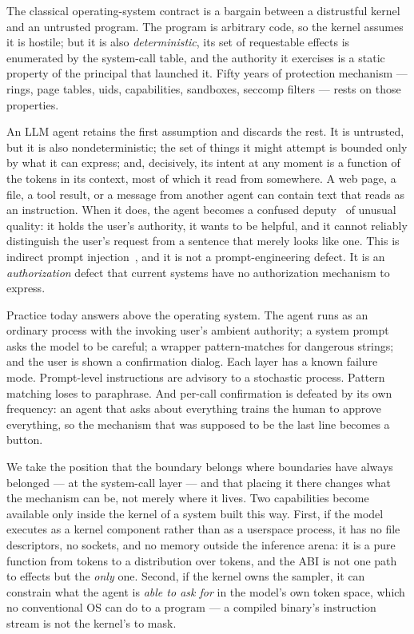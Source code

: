 \documentclass[11pt]{article}
\begin{document}
The classical operating-system contract is a bargain between a distrustful
kernel and an untrusted program. The program is arbitrary code, so the kernel
assumes it is hostile; but it is also \emph{deterministic}, its set of
requestable effects is enumerated by the system-call table, and the authority
it exercises is a static property of the principal that launched it. Fifty
years of protection mechanism --- rings, page tables, uids, capabilities,
sandboxes, seccomp filters --- rests on those properties.

An LLM agent retains the first assumption and discards the rest. It is
untrusted, but it is also nondeterministic; the set of things it might attempt
is bounded only by what it can express; and, decisively, its intent at any
moment is a function of the tokens in its context, most of which it read from
somewhere. A web page, a file, a tool result, or a message from another agent
can contain text that reads as an instruction. When it does, the agent becomes
a confused deputy~\cite{hardy1988confused} of unusual quality: it holds the
user's authority, it wants to be helpful, and it cannot reliably distinguish
the user's request from a sentence that merely looks like one. This is
indirect prompt injection~\cite{greshake2023injection}, and it is not a
prompt-engineering defect. It is an \emph{authorization} defect that current
systems have no authorization mechanism to express.

Practice today answers above the operating system. The agent runs as an
ordinary process with the invoking user's ambient authority; a system prompt
asks the model to be careful; a wrapper pattern-matches for dangerous strings;
and the user is shown a confirmation dialog. Each layer has a known failure
mode. Prompt-level instructions are advisory to a stochastic process. Pattern
matching loses to paraphrase. And per-call confirmation is defeated by its own
frequency: an agent that asks about everything trains the human to approve
everything, so the mechanism that was supposed to be the last line becomes a
button.

We take the position that the boundary belongs where boundaries have always
belonged --- at the system-call layer --- and that placing it there changes
what the mechanism can be, not merely where it lives. Two capabilities become
available only inside the kernel of a system built this way. First, if the
model executes as a kernel component rather than as a userspace process, it
has no file descriptors, no sockets, and no memory outside the inference
arena: it is a pure function from tokens to a distribution over tokens, and
the ABI is not one path to effects but the \emph{only} one. Second, if the
kernel owns the sampler, it can constrain what the agent is \emph{able to ask
for} in the model's own token space, which no conventional OS can do to a
program --- a compiled binary's instruction stream is not the kernel's to mask.
\end{document}
